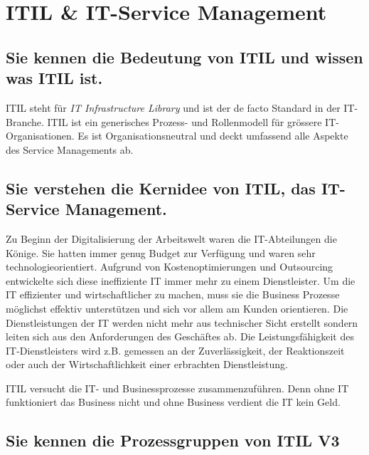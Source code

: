 \chapter{ITIL \& IT-Service Management}

\section{Sie kennen die Bedeutung von ITIL und wissen was ITIL ist.}

ITIL steht für \emph{IT Infrastructure Library} und ist der de facto Standard in der IT-Branche. ITIL ist ein generisches Prozess- und Rollenmodell für grössere IT-Organisationen. Es ist Organisationsneutral und deckt umfassend alle Aspekte des Service Managements ab. 

\section{Sie verstehen die Kernidee von ITIL, das IT-Service Management.}

Zu Beginn der Digitalisierung der Arbeitswelt waren die IT-Abteilungen die Könige. Sie hatten immer genug Budget zur Verfügung und waren sehr technologieorientiert. Aufgrund von Kostenoptimierungen und Outsourcing entwickelte sich diese ineffiziente IT immer mehr zu einem Dienstleister. Um die IT effizienter und wirtschaftlicher zu machen, muss sie die Business Prozesse möglichst effektiv unterstützen und sich vor allem am Kunden orientieren. Die Dienstleistungen der IT werden nicht mehr aus technischer Sicht erstellt sondern leiten sich aus den Anforderungen des Geschäftes ab. Die Leistungsfähigkeit des IT-Dienstleisters wird z.B. gemessen an der Zuverlässigkeit, der Reaktionszeit oder auch der Wirtschaftlichkeit einer erbrachten Dienstleistung.

ITIL versucht die IT- und Businessprozesse zusammenzuführen. Denn ohne IT funktioniert das Business nicht und ohne Business verdient die IT kein Geld.

\section{Sie kennen die Prozessgruppen von ITIL V3}

